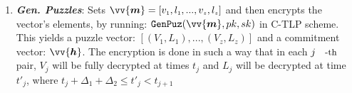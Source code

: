 \begin{enumerate}[leftmargin=.46cm]
\begin{enumerate}
\item\label{Gen-Puzzles-}\textbf{\textit{\small {Gen. Puzzles}}}: Sets $\vv{\bm{m}}=[v_{\scriptscriptstyle 1},l_{\scriptscriptstyle 1},...,v_{\scriptscriptstyle z},l_{\scriptscriptstyle z}]$  and then encrypts the vector's elements, by running: $\mathtt{GenPuz}(\vv{\bm{m}},pk,sk)$ in   C-TLP scheme. This yields a  puzzle vector: $[(V_{\scriptscriptstyle 1},L_{\scriptscriptstyle 1}),...,(V_{\scriptscriptstyle z},L_{\scriptscriptstyle z})]$ and a commitment vector: $\vv{\bm{h}}$. The encryption is done in  such a way that in each $j\text{\small{-th}}$ pair, $V_{\scriptscriptstyle j}$ will be fully decrypted at times $t_{\scriptscriptstyle j}$ and $L_{\scriptscriptstyle j}$ will be decrypted at time $t'_{\scriptscriptstyle j}$, where  $ t_{\scriptscriptstyle j}+\Delta_{\scriptscriptstyle 1}+\Delta_{\scriptscriptstyle 2}\leq t'_{\scriptscriptstyle j} < t_{\scriptscriptstyle j+1}$  %









\end{enumerate}
\end{enumerate}
